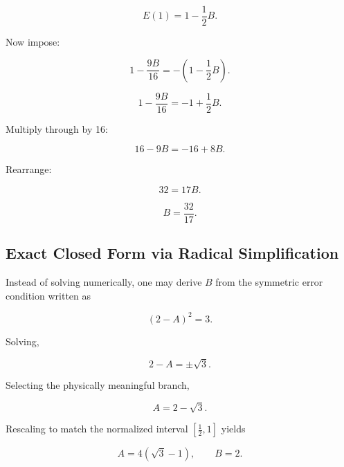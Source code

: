 \documentclass[12pt,a4paper]{article}
\begin{document}
\[
E(1)=1-\frac12B.
\]

Now impose:

\[
1-\frac{9B}{16}
=
-\left(1-\frac12B\right).
\]

\[
1-\frac{9B}{16}
=
-1+\frac12B.
\]

Multiply through by 16:

\[
16-9B
=
-16+8B.
\]

Rearrange:

\[
32=17B.
\]

\[
B=\frac{32}{17}.
\]

\subsection*{Exact Closed Form via Radical Simplification}

Instead of solving numerically, one may derive $B$
from the symmetric error condition written as

\[
(2-A)^2 = 3.
\]

Solving,

\[
2-A = \pm\sqrt{3}.
\]

Selecting the physically meaningful branch,

\[
A = 2-\sqrt{3}.
\]

Rescaling to match the normalized interval
$\left[\frac12,1\right]$ yields

\[
A = 4(\sqrt{3}-1),
\qquad
B = 2.
\]
\end{document}
